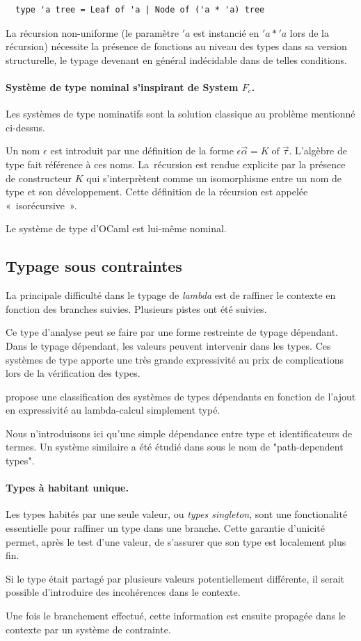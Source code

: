 \begin{lstlisting}
  type 'a tree = Leaf of 'a | Node of ('a * 'a) tree
\end{lstlisting}

La récursion non-uniforme (le paramètre $'a$ est instancié en $'a * 'a$ lors de
la récursion) nécessite la présence de fonctions au niveau des types dans sa
version structurelle, le typage devenant en général indécidable dans de telles
conditions.

\paragraph{Système de type nominal s'inspirant de System $F_c$.}
Les systèmes de type nominatifs sont la solution classique au problème
mentionné ci-dessus. 

Un nom $\epsilon$ est introduit par une définition de la forme $\epsilon
\vec{\alpha} = K \operatorname{of} \vec{\tau}$.  L'algèbre de type fait
référence à ces noms. La récursion est rendue explicite par la présence de 
constructeur $K$ qui s'interprètent comme un isomorphisme entre un nom de type
et son développement.  Cette définition de la récursion est appelée
« isorécursive ».

Le système de type d'OCaml est lui-même nominal.

\subsection{Typage sous contraintes}

La principale difficulté dans le typage de \emph{lambda} est de raffiner le
contexte en fonction des branches suivies.  Plusieurs pistes ont été suivies.

Ce type d'analyse peut se faire par une forme restreinte de typage dépendant.
Dans le typage dépendant, les valeurs peuvent intervenir dans les types. Ces
systèmes de type apporte une très grande expressivité au prix de complications
lors de la vérification des types. 

\cite{LambdaCube} propose une classification des systèmes de types dépendants en
fonction de l'ajout en expressivité au lambda-calcul simplement typé.

Nous n'introduisons ici qu'une simple dépendance entre type et identificateurs
de termes. Un système similaire a été étudié  dans \cite{Odersky02anominal} sous
le nom de "path-dependent types".

\paragraph{Types à habitant unique.}
Les types habités par une seule valeur, ou \emph{types singleton}, sont une
fonctionalité essentielle pour raffiner un type dans une branche.
Cette garantie d'unicité permet, après le test d'une valeur, de s'assurer que
son type est localement plus fin. 

Si le type était partagé par plusieurs valeurs potentiellement différente, il
serait possible d'introduire des incohérences dans le contexte.

Une fois le branchement effectué, cette information est ensuite propagée dans le
contexte par un système de contrainte.
